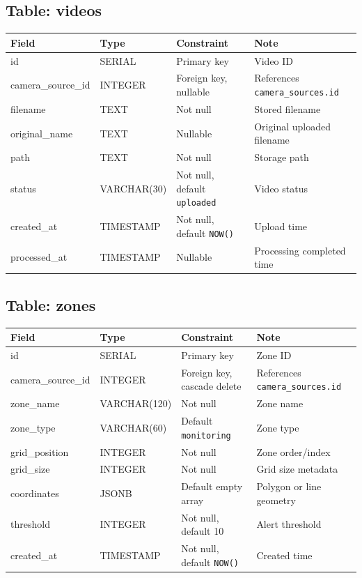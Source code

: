 \documentclass[12pt,a4paper]{report}
\begin{document}
{\subsection{Table: videos}
\begin{longtable}{|p{3.2cm}|p{3cm}|p{4.2cm}|p{4.5cm}|}
\hline
\rowcolor{HeaderBlue}
\textbf{Field} & \textbf{Type} & \textbf{Constraint} & \textbf{Note} \\
\hline
id & SERIAL & Primary key & Video ID \\
\hline
camera\_source\_id & INTEGER & Foreign key, nullable & References \texttt{camera\_sources.id} \\
\hline
filename & TEXT & Not null & Stored filename \\
\hline
original\_name & TEXT & Nullable & Original uploaded filename \\
\hline
path & TEXT & Not null & Storage path \\
\hline
status & VARCHAR(30) & Not null, default \texttt{uploaded} & Video status \\
\hline
created\_at & TIMESTAMP & Not null, default \texttt{NOW()} & Upload time \\
\hline
processed\_at & TIMESTAMP & Nullable & Processing completed time \\
\hline
\end{longtable}

\subsection{Table: zones}
\begin{longtable}{|p{3.2cm}|p{3cm}|p{4.2cm}|p{4.5cm}|}
\hline
\rowcolor{HeaderBlue}
\textbf{Field} & \textbf{Type} & \textbf{Constraint} & \textbf{Note} \\
\hline
id & SERIAL & Primary key & Zone ID \\
\hline
camera\_source\_id & INTEGER & Foreign key, cascade delete & References \texttt{camera\_sources.id} \\
\hline
zone\_name & VARCHAR(120) & Not null & Zone name \\
\hline
zone\_type & VARCHAR(60) & Default \texttt{monitoring} & Zone type \\
\hline
grid\_position & INTEGER & Not null & Zone order/index \\
\hline
grid\_size & INTEGER & Not null & Grid size metadata \\
\hline
coordinates & JSONB & Default empty array & Polygon or line geometry \\
\hline
threshold & INTEGER & Not null, default 10 & Alert threshold \\
\hline
created\_at & TIMESTAMP & Not null, default \texttt{NOW()} & Created time \\
\hline
\end{longtable}

}
\end{document}
